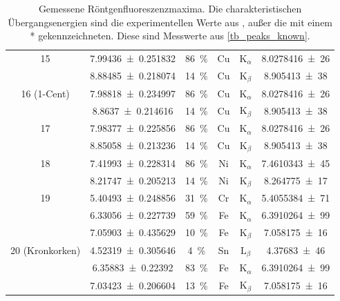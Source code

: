 \documentclass[
	a4paper,
	12pt,
	pagesize,
	ngerman
]{scrartcl}
\begin{document}
\begin{table}[H]
{\begin{tabular}{ c | c | c || c | c | c }
			15 
			& \SI{7.99436+-0.251832}{} &\SI{86}{\%}& Cu & $\text{K}_\alpha$ &  \SI{8,0278416(26)}{} \\
			& \SI{8.88485+-0.218074}{} &\SI{14}{\%}&  Cu &  $\text{K}_\beta$ & \SI{8,905413(38)}{} \\ 
			\hline
			
			16 (1-Cent)
			& \SI{7.98818+-0.234997}{} &\SI{86}{\%}& Cu & $\text{K}_\alpha$ &  \SI{8,0278416(26)}{} \\
			& \SI{8.8637+-0.214616}{} &\SI{14}{\%}& Cu &  $\text{K}_\beta$ & \SI{8,905413(38)}{} \\ 
			\hline
			
			17 
			& \SI{7.98377+-0.225856}{} &\SI{86}{\%}& Cu & $\text{K}_\alpha$ & \SI{8,0278416(26)}{} \\
			& \SI{8.85058+-0.213236}{} &\SI{14}{\%}& Cu & $\text{K}_\beta$ & \SI{8,905413(38)}{} \\ 
			\hline
			
			18 
			& \SI{7.41993+-0.228314}{} &\SI{86}{\%}& Ni & $\text{K}_\alpha$ & \SI{7,4610343(45)}{} \\
			& \SI{8.21747+-0.205213}{} &\SI{14}{\%}& Ni & $\text{K}_\beta$ &   \SI{8,264775(17)}{} \\ 
			\hline
			
			19 
			& \SI{5.40493+-0.248856}{} &\SI{31}{\%}& Cr & $\text{K}_\alpha$ & \SI{5,4055384(71)}{} \\
			& \SI{6.33056+-0.227739}{} &\SI{59}{\%}& Fe & $\text{K}_\alpha$ & \SI{ 6,3910264(99)}{} \\
			& \SI{7.05903+-0.435629}{} &\SI{10}{\%}& Fe &  $\text{K}_\beta $ & \SI{7,058175(16)}{} \\ 
			\hline
			
			20 (Kronkorken) 
			& \SI{4.52319+-0.305646}{} &\SI{4}{\%}& Sn & $\text{L}_\beta $ &  \SI{4,37683(46)}{} \\ %
			& \SI{6.35883+-0.22392}{} &\SI{83}{\%}& Fe & $\text{K}_\alpha $ &  \SI{6,3910264(99)}{} \\
			& \SI{7.03423+-0.206604}{} &\SI{13}{\%}& Fe & $\text{K}_\beta $ &  \SI{7,058175(16)}{} \\ 
			\hline
		\end{tabular}
		}
		\caption{Gemessene Röntgenfluoreszenzmaxima. Die charakteristischen Übergangsenergien sind die experimentellen Werte aus \cite{XRAYDB}, außer die mit einem * gekennzeichneten. Diese sind Messwerte aus \cref{tb_peaks_known}.} %
		\label{tb_peaks_unknown}
		
	\end{table}
	
\end{document}
